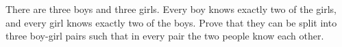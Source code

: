 There are three boys and three girls. Every boy knows exactly two of the girls, and every girl knows exactly two of the boys. Prove that they can be split into three boy-girl pairs such that in every pair the two people know each other.
